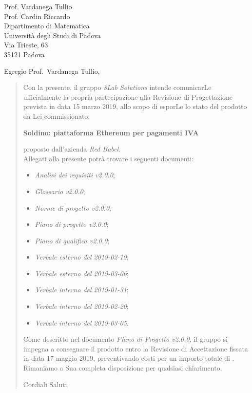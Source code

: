 
\begin{letter}{
		Prof. Vardanega Tullio \\
		Prof. Cardin Riccardo \\
		Dipartimento di Matematica \\
		Università degli Studi di Padova \\
		Via Trieste, 63 \\
		35121 Padova}
		
\opening{Egregio Prof.~Vardanega Tullio,}

\begin{quotation}
Con la presente, il gruppo \textit{8Lab Solutions} intende 
comunicarLe ufficialmente la propria partecipazione alla Revisione di 
Progettazione prevista in data 15 marzo 2019, allo scopo di 
esporLe lo stato del prodotto da Lei commissionato:

\begin{center}
	\textbf{Soldino: piattaforma Ethereum per pagamenti IVA}
\end{center}

\noindent proposto dall'azienda \textit{Red Babel}. \\
Allegati alla presente potrà trovare i seguenti documenti:

\begin{itemize}
	\item \textit{Analisi dei requisiti v2.0.0};
	
	\item \textit{Glossario v2.0.0};
	
	\item \textit{Norme di progetto v2.0.0};

	\item \textit{Piano di progetto v2.0.0};

	\item \textit{Piano di qualifica v2.0.0};
	
	\item \textit{Verbale esterno del 2019-02-19};
	\item \textit{Verbale esterno del 2019-03-06};
	\item \textit{Verbale interno del 2019-01-31};
	\item \textit{Verbale interno del 2019-02-20};
	\item \textit{Verbale interno del 2019-03-05}.
	
\end{itemize}

\noindent Come descritto nel documento \textit{Piano di Progetto v2.0.0}, il 
gruppo si impegna a consegnare il prodotto entro la Revisione di Accettazione 
fissata in data 17 maggio 2019, preventivando costi per un importo 
totale di \textbf{}.\\
Rimaniamo a Sua completa disposizione per qualsiasi chiarimento.

\vspace{0.15cm}
\closing{ Cordiali Saluti,}
	

\end{quotation}
		
\end{letter}

